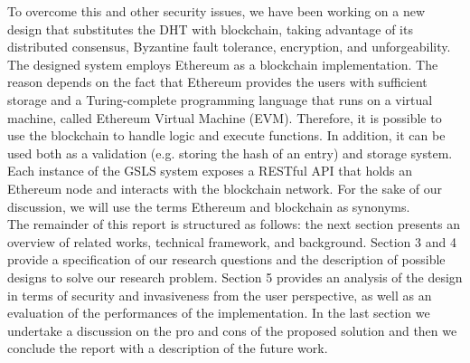 To overcome this and other security issues, we have been working on a new design that substitutes the DHT with blockchain, taking advantage of its distributed consensus, Byzantine fault tolerance, encryption, and unforgeability. The designed system employs Ethereum as a blockchain implementation. The reason depends on the fact that Ethereum provides the users with sufficient storage and a Turing-complete programming language that runs on a virtual machine, called Ethereum Virtual Machine (EVM). Therefore, it is possible to use the blockchain to handle logic and execute functions. In addition, it can be used both as a validation (e.g. storing the hash of an entry) and storage system. 
\\

Each instance of the GSLS system exposes a RESTful API that holds an Ethereum node and interacts with the blockchain network. For the sake of our discussion, we will use the terms Ethereum and blockchain as synonyms.
\\

The remainder of this report is structured as follows: the next section presents an overview of related works, technical framework, and background. Section 3 and 4 provide a specification of our research questions and the description of possible designs to solve our research problem. Section 5 provides an analysis of the design in terms of security and invasiveness from the user perspective, as well as an evaluation of the performances of the implementation. In the last section we undertake a discussion on the pro and cons of the proposed solution and then we conclude the report with a description of the future work. 
